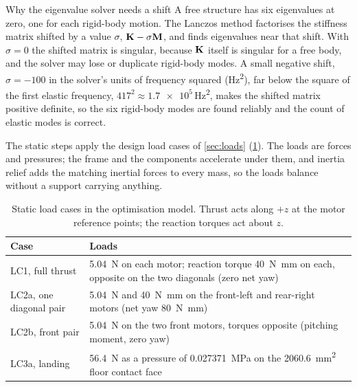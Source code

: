 \begin{theorybox}{Why the eigenvalue solver needs a shift}
A free structure has six eigenvalues at zero, one for each rigid-body motion. The Lanczos method factorises the stiffness matrix shifted by a value $\sigma$, $\mathbf{K} - \sigma\mathbf{M}$, and finds eigenvalues near that shift. With $\sigma = 0$ the shifted matrix is singular, because $\mathbf{K}$ itself is singular for a free body, and the solver may lose or duplicate rigid-body modes. A small negative shift, $\sigma = -100$ in the solver's units of frequency squared (\si{Hz^2}), far below the square of the first elastic frequency, $417^2 \approx \num{1.7e5}$\,\si{Hz^2}, makes the shifted matrix positive definite, so the six rigid-body modes are found reliably and the count of elastic modes is correct.
\end{theorybox}

The static steps apply the design load cases of \cref{sec:loads} (\cref{tab:optimisation_model-loads}). The loads are forces and pressures; the frame and the components accelerate under them, and inertia relief adds the matching inertial forces to every mass, so the loads balance without a support carrying anything.

\begin{table}[htbp]
\centering\small
\caption{Static load cases in the optimisation model. Thrust acts along $+z$ at the motor reference points; the reaction torques act about $z$.}\label{tab:optimisation_model-loads}
\begin{tabularx}{\linewidth}{@{}lX@{}}
\toprule
Case & Loads\\
\midrule
LC1, full thrust & \SI{5.04}{N} on each motor; reaction torque \SI{40}{N.mm} on each, opposite on the two diagonals (zero net yaw)\\
LC2a, one diagonal pair & \SI{5.04}{N} and \SI{40}{N.mm} on the front-left and rear-right motors (net yaw \SI{80}{N.mm})\\
LC2b, front pair & \SI{5.04}{N} on the two front motors, torques opposite (pitching moment, zero yaw)\\
LC3a, landing & \SI{56.4}{N} as a pressure of \SI{0.027371}{MPa} on the \SI{2060.6}{mm^2} floor contact face\\
\bottomrule
\end{tabularx}
\end{table}

